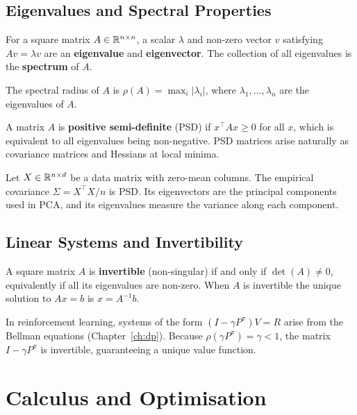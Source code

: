 \subsection*{Eigenvalues and Spectral Properties}

For a square matrix $A \in \mathbb{R}^{n \times n}$, a scalar $\lambda$ and
non-zero vector $v$ satisfying $Av = \lambda v$ are an
\textbf{eigenvalue} and \textbf{eigenvector}.  The
collection of all eigenvalues is the \textbf{spectrum} of $A$.

\begin{definition}
\label{def:spectral-radius}
The spectral radius of $A$ is $\rho(A) = \max_i |\lambda_i|$, where
$\lambda_1, \ldots, \lambda_n$ are the eigenvalues of $A$.
\end{definition}

A matrix $A$ is \textbf{positive semi-definite} (PSD) if $x^\top A x \geq 0$
for all $x$, which is equivalent to all eigenvalues being non-negative.
PSD matrices arise naturally as covariance matrices and Hessians at local
minima.

\begin{example}
Let $X \in \mathbb{R}^{n \times d}$ be a data matrix with zero-mean columns.  The
empirical covariance $\Sigma = X^\top X / n$ is PSD.  Its eigenvectors are
the principal components used in PCA, and its eigenvalues measure the
variance along each component.
\end{example}

\subsection*{Linear Systems and Invertibility}

A square matrix $A$ is \textbf{invertible} (non-singular) if and only if
$\det(A) \neq 0$, equivalently if all its eigenvalues are non-zero.  When
$A$ is invertible the unique solution to $Ax = b$ is $x = A^{-1}b$.

In reinforcement learning, systems of the form $(I - \gamma P^\pi) V = R$
arise from the Bellman equations (Chapter~\ref{ch:dp}).  Because
$\rho(\gamma P^\pi) = \gamma < 1$, the matrix $I - \gamma P^\pi$ is
invertible, guaranteeing a unique value function.

\section{Calculus and Optimisation}
\label{app:calculus}


